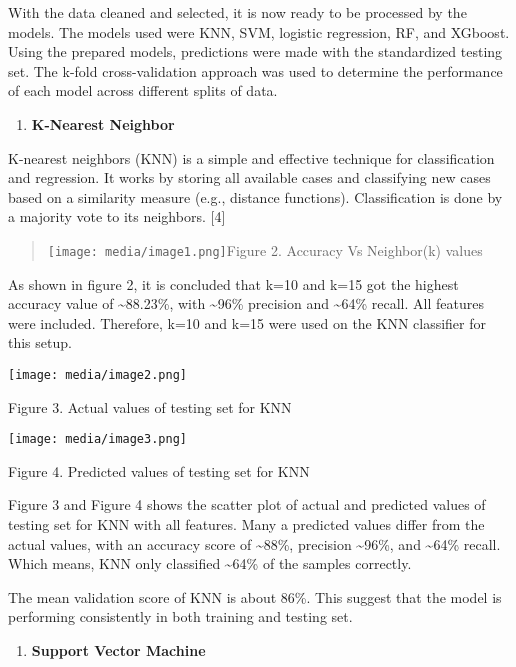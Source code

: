\documentclass[
]{article}
\begin{document}
With the data cleaned and selected, it is now ready to be processed by
the models. The models used were KNN, SVM, logistic regression, RF, and
XGboost. Using the prepared models, predictions were made with the
standardized testing set. The k-fold cross-validation approach was used
to determine the performance of each model across different splits of
data.

\begin{enumerate}
\def\labelenumi{\alph{enumi})}
\item
  \textbf{K-Nearest Neighbor}
\end{enumerate}

K-nearest neighbors (KNN) is a simple and effective technique for
classification and regression. It works by storing all available cases
and classifying new cases based on a similarity measure (e.g., distance
functions). Classification is done by a majority vote to its neighbors.
{[}4{]}

\begin{quote}
\texttt{[image: media/image1.png]}Figure
2. Accuracy Vs Neighbor(k) values
\end{quote}

As shown in figure 2, it is concluded that k=10 and k=15 got the highest
accuracy value of \textasciitilde88.23\%, with \textasciitilde96\%
precision and \textasciitilde64\% recall. All features were included.
Therefore, k=10 and k=15 were used on the KNN classifier for this setup.

\texttt{[image: media/image2.png]}

Figure 3. Actual values of testing set for KNN

\texttt{[image: media/image3.png]}

Figure 4. Predicted values of testing set for KNN

Figure 3 and Figure 4 shows the scatter plot of actual and predicted
values of testing set for KNN with all features. Many a predicted values
differ from the actual values, with an accuracy score of
\textasciitilde88\%, precision \textasciitilde96\%, and
\textasciitilde64\% recall. Which means, KNN only classified
\textasciitilde64\% of the samples correctly.

The mean validation score of KNN is about 86\%. This suggest that the
model is performing consistently in both training and testing set.

\begin{enumerate}
\def\labelenumi{\alph{enumi})}
\setcounter{enumi}{1}
\item
  \textbf{Support Vector Machine}
\end{enumerate}
\end{document}
